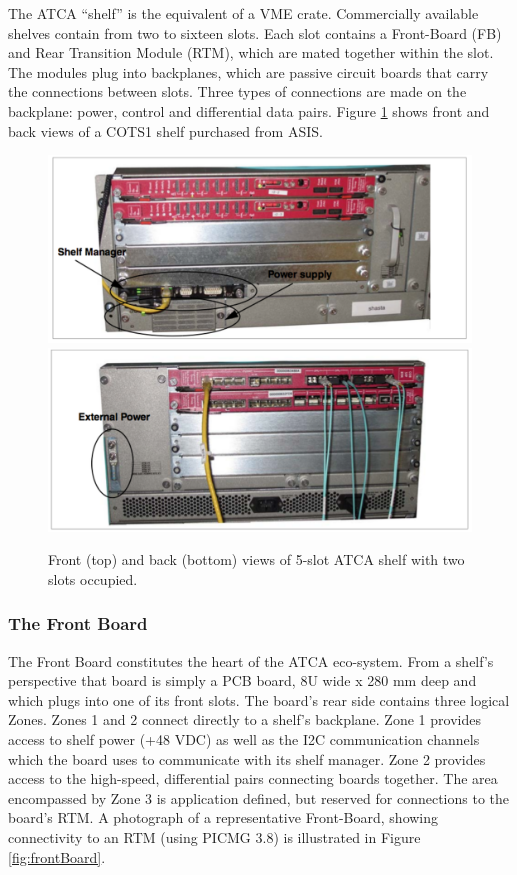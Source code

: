 The ATCA ``shelf'' is the equivalent of a VME crate. 
Commercially available shelves contain from two to sixteen slots. 
Each slot contains a Front-Board (FB) and Rear Transition Module (RTM),
which are mated together within the slot.
The modules plug into backplanes, which are passive circuit boards that
carry the connections between slots. 
Three types of connections are made on the backplane: 
power, control and differential data pairs. 
Figure \ref{fig:frontShelf} shows front and back views of a
 COTS1 shelf purchased from ASIS. 

\begin{figure}[tbh]
\includegraphics[scale=0.6]{shelf-front.pdf}
\includegraphics[scale=0.6]{shelf-back.pdf}
\caption{Front (top) and back (bottom) views of 5-slot ATCA shelf with two slots
occupied.}
\label{fig:frontShelf}
\end{figure} 

\subsubsection{The Front Board}
\label{sec:frontboard}
The Front Board constitutes the heart of the ATCA eco-system. 
From a shelf's perspective that board is simply a PCB board, 
8U wide x 280 mm deep and which plugs into one of its front slots. 
The board's rear side contains three logical Zones.
Zones 1 and 2 connect directly to a shelf's backplane. 
Zone 1 provides access to shelf power (+48 VDC) as well as the
I2C communication channels which the board uses to communicate with its shelf manager. 
Zone 2 provides access to the high-speed, differential pairs connecting boards together. 
The area encompassed by Zone 3 is application defined, but reserved for connections 
to the board's RTM.
A photograph of a representative Front-Board, 
showing connectivity to an RTM (using PICMG 3.8) 
is illustrated in Figure \ref{fig:frontBoard}.

